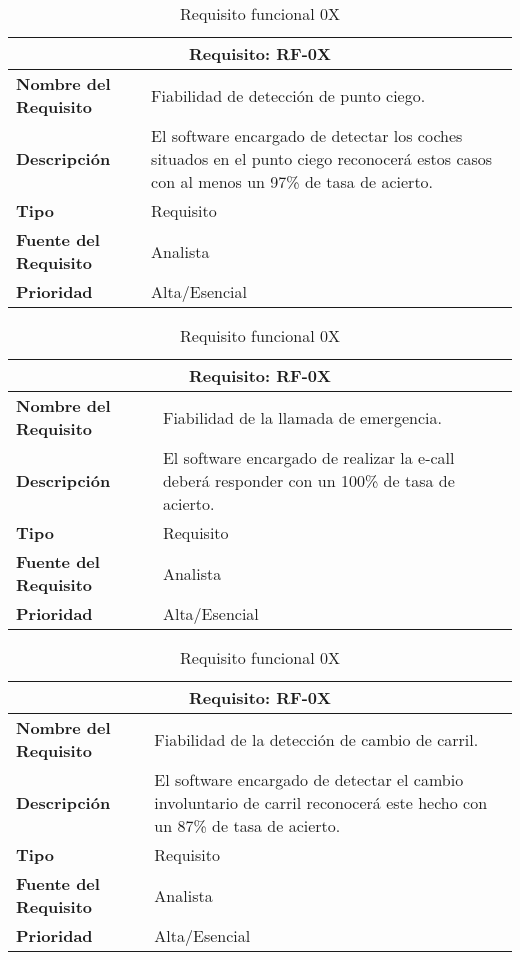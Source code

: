 \begin{table}[H]
\begin{center}
\begin{tabular}{p{} p{7cm}}
\multicolumn{2}{c}{\textbf{Requisito: RF-0X} } \\
\hline \hline
\textbf{Nombre del Requisito} & Fiabilidad de detección de punto ciego.\\
\hline
\textbf{Descripción} & El software encargado de detectar los coches situados en el punto ciego reconocerá estos casos con al menos un 97\% de tasa de acierto.\\
\hline
\textbf{Tipo} & Requisito  \\
\hline
\textbf{Fuente del Requisito} & Analista  \\
\hline
\textbf{Prioridad} & Alta/Esencial \\ \hline
\end{tabular}
\caption{Requisito funcional 0X}
\label{tab:personal}
\end{center}
\end{table}

\begin{table}[H]
\begin{center}
\begin{tabular}{p{} p{7cm}}
\multicolumn{2}{c}{\textbf{Requisito: RF-0X} } \\
\hline \hline
\textbf{Nombre del Requisito} & Fiabilidad de la llamada de emergencia.\\
\hline
\textbf{Descripción} & El software encargado de realizar la e-call deberá responder con un 100\% de tasa de acierto.\\
\hline
\textbf{Tipo} & Requisito  \\
\hline
\textbf{Fuente del Requisito} & Analista  \\
\hline
\textbf{Prioridad} & Alta/Esencial \\ \hline
\end{tabular}
\caption{Requisito funcional 0X}
\label{tab:personal}
\end{center}
\end{table}

\begin{table}[H]
\begin{center}
\begin{tabular}{p{} p{7cm}}
\multicolumn{2}{c}{\textbf{Requisito: RF-0X} } \\
\hline \hline
\textbf{Nombre del Requisito} & Fiabilidad de la detección de cambio de carril.\\
\hline
\textbf{Descripción} &  El software encargado de detectar el cambio involuntario de carril reconocerá este hecho con un 87\% de tasa de acierto.\\
\hline
\textbf{Tipo} & Requisito  \\
\hline
\textbf{Fuente del Requisito} & Analista  \\
\hline
\textbf{Prioridad} & Alta/Esencial \\ \hline
\end{tabular}
\caption{Requisito funcional 0X}
\label{tab:personal}
\end{center}
\end{table}

